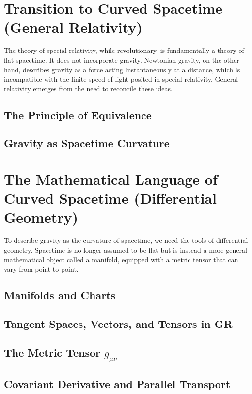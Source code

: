 \documentclass{amsart}
\theoremstyle{definition}
\theoremstyle{remark}
\begin{document}
\section{Transition to Curved Spacetime (General Relativity)}
\label{sec:transition_gr}
The theory of special relativity, while revolutionary, is fundamentally a theory of flat spacetime. It does not incorporate gravity. Newtonian gravity, on the other hand, describes gravity as a force acting instantaneously at a distance, which is incompatible with the finite speed of light posited in special relativity. General relativity emerges from the need to reconcile these ideas.

\subsection{The Principle of Equivalence}

\subsection{Gravity as Spacetime Curvature}

\section{The Mathematical Language of Curved Spacetime (Differential Geometry)}
\label{sec:math_gr}
To describe gravity as the curvature of spacetime, we need the tools of differential geometry. Spacetime is no longer assumed to be flat but is instead a more general mathematical object called a manifold, equipped with a metric tensor that can vary from point to point.
\subsection{Manifolds and Charts}
\subsection{Tangent Spaces, Vectors, and Tensors in GR}
\subsection{The Metric Tensor $g_{\mu\nu}$}
\subsection{Covariant Derivative and Parallel Transport}
\end{document}
